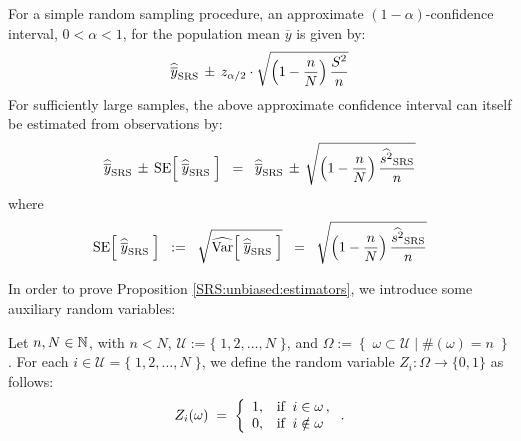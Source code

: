 \documentclass{article}
\begin{document}
\begin{corollary}\quad
For a simple random sampling procedure, an approximate $(1-\alpha)$-confidence interval, $0 < \alpha < 1$, for the population mean $\overline{y}$ is given by:
\begin{equation*}
\widehat{\overline{y}}_{\textnormal{SRS}} \, \pm \, z_{\alpha/2} \cdot \sqrt{\left(1-\dfrac{n}{N}\right)\dfrac{S^{2}}{n}}
\end{equation*}
For sufficiently large samples, the above approximate confidence interval can itself be estimated from observations by:
\begin{equation*}
\widehat{\overline{y}}_{\textnormal{SRS}} \, \pm \, \textnormal{SE}\!\left[\; \widehat{\overline{y}}_{\textnormal{SRS}} \;\right]
\;\; = \;\;
\widehat{\overline{y}}_{\textnormal{SRS}} \, \pm \, \sqrt{ \left(1-\dfrac{n}{N}\right)\dfrac{\widehat{s^{2}}_{\textnormal{SRS}}}{n} }
\end{equation*}
where
\begin{equation*}
\textnormal{SE}\!\left[\; \widehat{\overline{y}}_{\textnormal{SRS}} \;\right]
\;\; := \;\;
\sqrt{ \widehat{\textnormal{Var}}\!\left[\;\widehat{\overline{y}}_{\textnormal{SRS}}\;\right] }
\;\; = \;\;
\sqrt{ \left(1-\dfrac{n}{N}\right)\dfrac{\widehat{s^{2}}_{\textnormal{SRS}}}{n} }
\end{equation*}
\end{corollary}

\noindent
In order to prove Proposition \ref{SRS:unbiased:estimators}, we introduce some auxiliary random variables:

\begin{definition}\quad
Let $n, N \in \mathbb{N}$, with $n<N$, $\mathcal{U} := \{\;1,2,\ldots,N\;\}$, and $\Omega := \left\{\;\omega\subset\mathcal{U}\;\vert\;\#(\omega)=n\;\right\}$.  For each $i \in \mathcal{U} = \{\;1,2,\ldots,N\;\}$, we define the random variable $Z_{i} : \Omega \longrightarrow \{0,1\}$ as follows:
\begin{equation*}
    Z_{i}(\omega) \; = \;
    \left\{
    \begin{array}{cl}
        1, & \textnormal{if}\;\; i \in \omega\,, \\
        0, & \textnormal{if}\;\; i \notin \omega
    \end{array}
    \right..
\end{equation*}
\end{definition}
\end{document}

